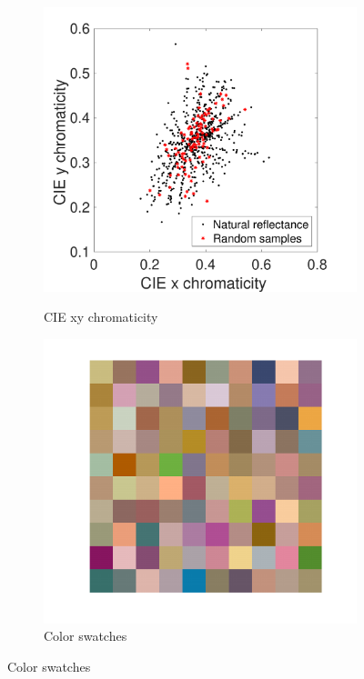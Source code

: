 \documentclass{jov}
\begin{document}
\begin{figure}
\begin{subfigure}{0.24 \textwidth}
        \label{fig:reflectanceSamples}
    \end{subfigure}
    \begin{subfigure}{0.24 \textwidth}
    \centering
    \caption{CIE xy chromaticity}
        \includegraphics[width=\textwidth]{../FiguresDraft4/Figure7/Figure7_c.pdf}
        \label{fig:xyChroReflectance}
    \end{subfigure}    
    \centering
	\begin{subfigure}{0.24 \textwidth}
    \centering
        \caption{Color swatches}
        \includegraphics[width=\textwidth]{../FiguresDraft4/Figure7/Figure7_d.pdf}

\end{subfigure}
\end{figure}
\end{document}
